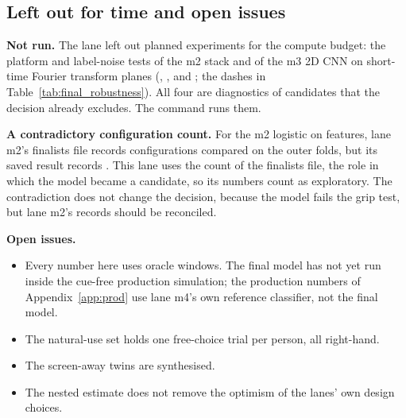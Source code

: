 
\subsection{Left out for time and open issues}\label{app:final:open}

\textbf{Not run.}
The lane left out  planned experiments for the compute budget: the platform and label-noise tests of the m2 stack and of the m3 2D CNN on short-time Fourier transform planes (, ,  and ; the dashes in Table~\ref{tab:final_robustness}).
All four are diagnostics of candidates that the decision already excludes.
The command  runs them.

\textbf{A contradictory configuration count.}
For the m2 logistic on  features, lane m2's finalists file records  configurations compared on the outer folds, but its saved result records .
This lane uses the count of the finalists file, the role in which the model became a candidate, so its numbers count as exploratory.
The contradiction does not change the decision, because the model fails the grip test, but lane m2's records should be reconciled.

\textbf{Open issues.}
\begin{itemize}[nosep]
  \item Every number here uses oracle windows. The final model has not yet run inside the cue-free production simulation; the production numbers of Appendix~\ref{app:prod} use lane m4's own reference classifier, not the final model.
  \item The natural-use set holds one free-choice trial per person, all right-hand.
  \item The screen-away twins are synthesised.
  \item The nested estimate does not remove the optimism of the lanes' own design choices.
\end{itemize}
